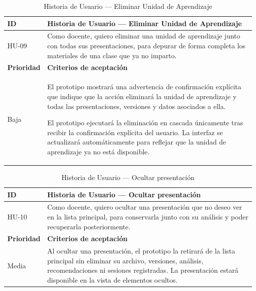 \documentclass[11pt]{article}
\newcommand{\ttstyle}{%
  \small
  \setlength{\tabcolsep}{6pt}%
  \renewcommand{\arraystretch}{1.25}%
  \arrayrulecolor{azulprofundo}%
}
\newcommand{\hairrule}{%
  \arrayrulecolor{azulregla}\midrule[0.3pt]\arrayrulecolor{azulprofundo}%
}
\begin{document}
\begin{table}[H]
    \centering
    \renewcommand{\arraystretch}{1.2}
    \ttstyle
    \begin{tabular}{p{2.5cm}p{11cm}}
        \toprule
        \textbf{ID} & \textbf{Historia de Usuario --- Eliminar Unidad de Aprendizaje} \\
        \midrule
        HU-09 & Como docente, quiero eliminar una unidad de aprendizaje junto con todas sus presentaciones, para depurar de forma completa los materiales de una clase que ya no imparto. \\
        \hairrule
        \textbf{Prioridad} & \textbf{Criterios de aceptación} \\
        \hairrule
        Baja & El prototipo mostrará una advertencia de confirmación explícita que indique que la acción eliminará la unidad de aprendizaje y todas las presentaciones, versiones y datos asociados a ella. 
        
        El prototipo ejecutará la eliminación en cascada únicamente tras recibir la confirmación explícita del usuario. La interfaz se actualizará automáticamente para reflejar que la unidad de aprendizaje ya no está disponible. \\
        \bottomrule
    \end{tabular}
    \caption{Historia de Usuario — Eliminar Unidad de Aprendizaje}
    \label{tab:hu-eliminar-unidad-aprendizaje}
\end{table}

\begin{table}[H]
    \centering
    \renewcommand{\arraystretch}{1.2}
    \ttstyle
    \begin{tabular}{p{2.5cm}p{11cm}}
        \toprule
        \textbf{ID} & \textbf{Historia de Usuario --- Ocultar presentación} \\
        \midrule
        HU-10 & Como docente, quiero ocultar una presentación que no deseo ver en la lista principal, para conservarla junto con su análisis y poder recuperarla posteriormente. \\
        \hairrule
        \textbf{Prioridad} & \textbf{Criterios de aceptación} \\
        \hairrule
        Media & Al ocultar una presentación, el prototipo la retirará de la lista principal sin eliminar su archivo, versiones, análisis, recomendaciones ni sesiones registradas. La presentación estará disponible en la vista de elementos ocultos. \\
        \bottomrule
    \end{tabular}
    \caption{Historia de Usuario --- Ocultar presentación}
    \label{tab:hu-ocultar-presentacion}
\end{table}
\end{document}
